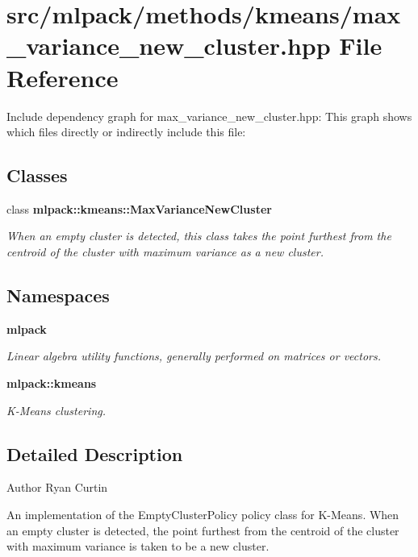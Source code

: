\section{src/mlpack/methods/kmeans/max\-\_\-variance\-\_\-new\-\_\-cluster.hpp File Reference}
\label{max__variance__new__cluster_8hpp}
Include dependency graph for max\-\_\-variance\-\_\-new\-\_\-cluster.\-hpp\-:
This graph shows which files directly or indirectly include this file\-:
\subsection*{Classes}
\begin{DoxyCompactItemize}
\item 
class {\bf mlpack\-::kmeans\-::\-Max\-Variance\-New\-Cluster}
\begin{DoxyCompactList}\small\item\em When an empty cluster is detected, this class takes the point furthest from the centroid of the cluster with maximum variance as a new cluster. \end{DoxyCompactList}\end{DoxyCompactItemize}
\subsection*{Namespaces}
\begin{DoxyCompactItemize}
\item 
{\bf mlpack}
\begin{DoxyCompactList}\small\item\em Linear algebra utility functions, generally performed on matrices or vectors. \end{DoxyCompactList}\item 
{\bf mlpack\-::kmeans}
\begin{DoxyCompactList}\small\item\em K-\/\-Means clustering. \end{DoxyCompactList}\end{DoxyCompactItemize}


\subsection{Detailed Description}
\begin{DoxyAuthor}{Author}
Ryan Curtin
\end{DoxyAuthor}
An implementation of the Empty\-Cluster\-Policy policy class for K-\/\-Means. When an empty cluster is detected, the point furthest from the centroid of the cluster with maximum variance is taken to be a new cluster.

